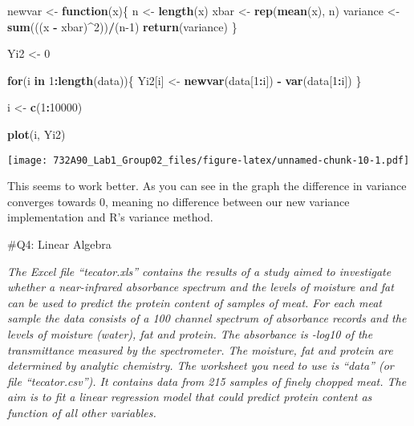 \documentclass[]{article}
\newenvironment{Shaded}{\begin{snugshade}}{\end{snugshade}}
\newcommand{\ControlFlowTok}[1]{\textcolor[rgb]{0.13,0.29,0.53}{\textbf{#1}}}
\newcommand{\DecValTok}[1]{\textcolor[rgb]{0.00,0.00,0.81}{#1}}
\newcommand{\KeywordTok}[1]{\textcolor[rgb]{0.13,0.29,0.53}{\textbf{#1}}}
\newcommand{\NormalTok}[1]{#1}
\newcommand{\OperatorTok}[1]{\textcolor[rgb]{0.81,0.36,0.00}{\textbf{#1}}}
\newcommand{\StringTok}[1]{\textcolor[rgb]{0.31,0.60,0.02}{#1}}
\begin{document}
\begin{Shaded}
\begin{Highlighting}[]
\NormalTok{newvar <-}\StringTok{ }\ControlFlowTok{function}\NormalTok{(x)\{}
\NormalTok{  n <-}\StringTok{ }\KeywordTok{length}\NormalTok{(x)}
\NormalTok{  xbar <-}\StringTok{ }\KeywordTok{rep}\NormalTok{(}\KeywordTok{mean}\NormalTok{(x), n)}
\NormalTok{  variance <-}\StringTok{ }\KeywordTok{sum}\NormalTok{(((x }\OperatorTok{-}\StringTok{ }\NormalTok{xbar)}\OperatorTok{^}\DecValTok{2}\NormalTok{))}\OperatorTok{/}\NormalTok{(n}\DecValTok{-1}\NormalTok{)}
  \KeywordTok{return}\NormalTok{(variance)}
\NormalTok{\}}

\NormalTok{Yi2 <-}\StringTok{ }\DecValTok{0}

\ControlFlowTok{for}\NormalTok{(i }\ControlFlowTok{in} \DecValTok{1}\OperatorTok{:}\KeywordTok{length}\NormalTok{(data))\{}
\NormalTok{  Yi2[i] <-}\StringTok{ }\KeywordTok{newvar}\NormalTok{(data[}\DecValTok{1}\OperatorTok{:}\NormalTok{i]) }\OperatorTok{-}\StringTok{ }\KeywordTok{var}\NormalTok{(data[}\DecValTok{1}\OperatorTok{:}\NormalTok{i])}
\NormalTok{\}}

\NormalTok{i <-}\StringTok{ }\KeywordTok{c}\NormalTok{(}\DecValTok{1}\OperatorTok{:}\DecValTok{10000}\NormalTok{)}

\KeywordTok{plot}\NormalTok{(i, Yi2)}
\end{Highlighting}
\end{Shaded}

\texttt{[image: 732A90\_Lab1\_Group02\_files/figure-latex/unnamed-chunk-10-1.pdf]}

This seems to work better. As you can see in the graph the difference in
variance converges towards 0, meaning no difference between our new
variance implementation and R's variance method.

\newpage

\#Q4: Linear Algebra

\emph{The Excel file ``tecator.xls'' contains the results of a study
aimed to investigate whether a near-infrared absorbance spectrum and the
levels of moisture and fat can be used to predict the protein content of
samples of meat. For each meat sample the data consists of a 100 channel
spectrum of absorbance records and the levels of moisture (water), fat
and protein. The absorbance is -log10 of the transmittance measured by
the spectrometer. The moisture, fat and protein are determined by
analytic chemistry. The worksheet you need to use is ``data'' (or file
``tecator.csv''). It contains data from 215 samples of finely chopped
meat. The aim is to fit a linear regression model that could predict
protein content as function of all other variables.}
\end{document}
